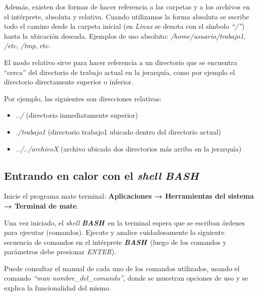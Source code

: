 \documentclass[12pt]{article}
\newcommand{\bash}{\textbf{\emph{BASH}}\ }
\begin{document}
Además, existen dos formas de hacer referencia a las carpetas y a los archivos
en el intérprete, absoluta y relativa. Cuando utilizamos la forma absoluta se
escribe todo el camino desde la carpeta inicial (en \emph{Linux} se denota con
el símbolo \emph{``/''}) hasta la ubicación deseada. Ejemplos de uso absoluto:
\emph{/home/usuario/trabajo1}, \emph{/etc}, \emph{/tmp}, etc.

El modo relativo sirve para hacer referencia a un directorio que se encuentra
``cerca'' del directorio de trabajo actual en la jerarquía, como por ejemplo
el directorio directamente superior o inferior.

Por ejemplo, las siguientes son direcciones relativas:

\vspace{-2\topsep}
\begin{itemize}

    \itemsep2pt \parskip0pt 

    \item \emph{../} (directorio inmediatamente superior)

    \item \emph{./trabajo1} (directorio trabajo1 ubicado dentro del directorio
        actual)

    \item \emph{../../archivoX} (archivo ubicado dos directorios más arriba en
        la jerarquía)

\end{itemize}

\subsection{Entrando en calor con el \emph{shell} \bash}

Inicie el programa mate terminal: \textbf{Aplicaciones → Herramientas del sistema →
Terminal de mate}.

Una vez iniciado, el \emph{shell} \bash en la terminal espera que se escriban
órdenes para ejecutar (comandos). Ejecute y analice cuidadosamente la
siguiente secuencia de comandos en el intérprete \bash (luego de los comandos
y parámetros debe presionar \emph{ENTER}).

Puede consultar el manual de cada uno de los comandos utilizados, usando el
comando \emph{``man nombre\_del\_comando''}, donde se muestran opciones de uso y
se explica la funcionalidad del mismo.
\end{document}
